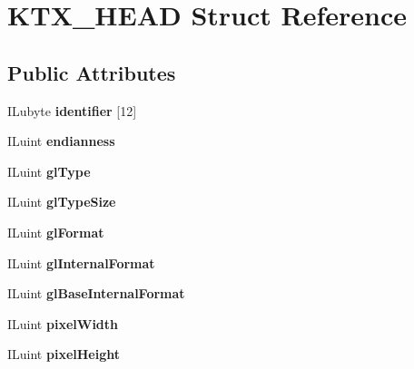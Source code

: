 \hypertarget{structKTX__HEAD}{}\section{K\+T\+X\+\_\+\+H\+E\+AD Struct Reference}
\label{structKTX__HEAD}
\subsection*{Public Attributes}
\begin{DoxyCompactItemize}
\item 
\mbox{\label{structKTX__HEAD_a4e8fb005e1bf58af5d7507c2c123a232}} 
I\+Lubyte {\bfseries identifier} \mbox{[}12\mbox{]}
\item 
\mbox{\label{structKTX__HEAD_ab8e48dbc1e79b0acee08746f263329dc}} 
I\+Luint {\bfseries endianness}
\item 
\mbox{\label{structKTX__HEAD_a4283c0d2b2deae759c924e74935f635e}} 
I\+Luint {\bfseries gl\+Type}
\item 
\mbox{\label{structKTX__HEAD_a8775aa2126cb0a0c12fcb08cfc15d957}} 
I\+Luint {\bfseries gl\+Type\+Size}
\item 
\mbox{\label{structKTX__HEAD_a778f77ca6d80fd6e512eb46f4c96eeee}} 
I\+Luint {\bfseries gl\+Format}
\item 
\mbox{\label{structKTX__HEAD_a4c8d516c3f24e28861688388668a5776}} 
I\+Luint {\bfseries gl\+Internal\+Format}
\item 
\mbox{\label{structKTX__HEAD_abff18932afe13dae8a19d5933b855bee}} 
I\+Luint {\bfseries gl\+Base\+Internal\+Format}
\item 
\mbox{\label{structKTX__HEAD_a265231cf44c46f8243b529d80b76ecd6}} 
I\+Luint {\bfseries pixel\+Width}
\item 
\mbox{\label{structKTX__HEAD_a8248c9cd47402c31c193acbbf402151c}} 
I\+Luint {\bfseries pixel\+Height}
\item 
\mbox{\label{structKTX__HEAD_ae5d4e0155cd92ce66c4bf0cbd34ee885}} 

\end{DoxyCompactItemize}
